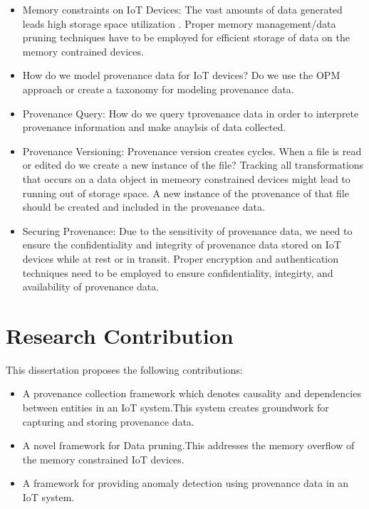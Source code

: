 \begin{itemize}

\item Memory constraints on IoT Devices: The vast amounts of data generated leads high storage space utilization . Proper memory management/data pruning techniques have to be employed for efficient storage of data on the memory contrained devices. 

\item How do we model provenance data for IoT devices? Do we use the OPM approach or create a taxonomy for modeling provenance data.

\item Provenance Query: How do we query tprovenance data in order to interprete provenance information and make anaylsis of data collected.

\item Provenance Versioning: Provenance version creates cycles. When a file is read or edited do we create a new instance of the file? Tracking all transformations that occurs on a data object in memeory constrained devices might lead to running out of storage space. A new instance of the provenance of that file should be created and included in the provenance data.

\item Securing Provenance: Due to the sensitivity of provenance data, we need to ensure the confidentiality and integrity of provenance data stored on IoT devices while at rest or in transit. Proper encryption and authentication techniques need to be employed to ensure confidentiality, integirty, and availability of provenance data.
\end{itemize}

\section{Research Contribution}

This dissertation proposes the following contributions:

\begin{itemize}
  \item A provenance collection framework which denotes causality and dependencies between entities in an IoT system.This system creates groundwork for capturing and storing provenance data.
  \item A novel framework for Data pruning.This addresses the memory overflow of the memory constrained IoT devices.
   \item A framework for providing anomaly detection using provenance data in an IoT system.
\end{itemize}

